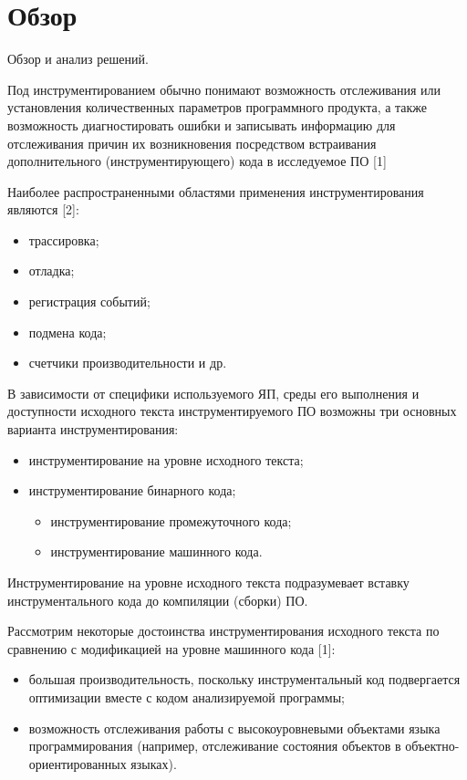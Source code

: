 \chapter{Обзор}

Обзор и анализ решений.

Под инструментированием обычно понимают возможность отслеживания или установления количественных параметров программного продукта, а также возможность диагностировать ошибки и записывать информацию для отслеживания причин их возникновения посредством встраивания дополнительного (инструментирующего) кода в исследуемое ПО [1]

Наиболее распространенными областями применения инструментирования являются [2]:

\begin{itemize}
  \item трассировка;
  \item отладка;
  \item регистрация событий;
  \item подмена кода;
  \item счетчики производительности и др.
\end{itemize}

В зависимости от специфики используемого ЯП, среды его выполнения и доступности исходного текста инструментируемого ПО возможны три основных варианта инструментирования:

\begin{itemize}
  \item инструментирование на уровне исходного текста;
  \item инструментирование бинарного кода;
  \begin{itemize}
    \item инструментирование промежуточного кода;
    \item инструментирование машинного кода.
  \end{itemize}
\end{itemize}

Инструментирование на уровне исходного текста подразумевает вставку инструментального кода до компиляции (сборки) ПО.

Рассмотрим некоторые достоинства инструментирования исходного текста по сравнению с модификацией на уровне машинного кода [1]:
\begin{itemize}
  \item большая производительность, поскольку инструментальный код подвергается оптимизации вместе с кодом анализируемой программы;
  \item возможность отслеживания работы с высокоуровневыми объектами языка программирования (например, отслеживание состояния объектов в объектно-ориентированных языках).
\end{itemize}

